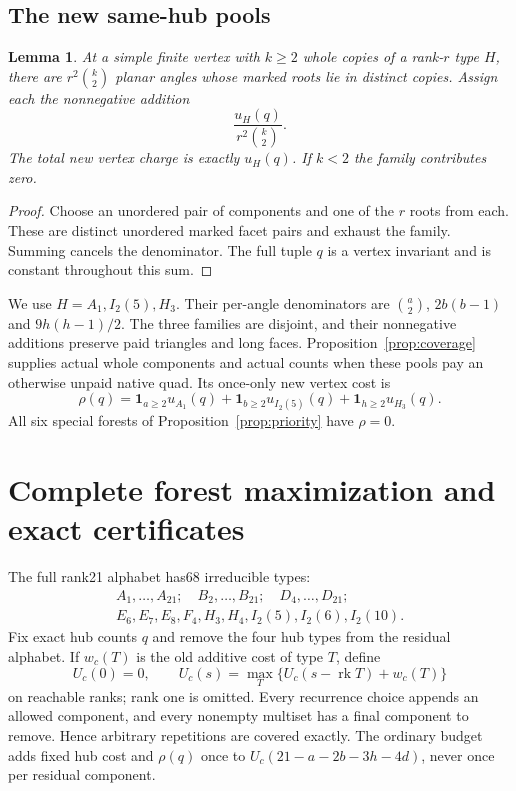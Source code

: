 \documentclass[11pt]{article}
\newtheorem{lemma}[theorem]{Lemma}
\newcommand{\rk}{\operatorname{rk}}
\begin{document}
\subsection{The new same-hub pools}
\begin{lemma}\label{lem:pools}
At a simple finite vertex with $k\ge2$ whole copies of a rank-$r$ type
$H$, there are $r^2\binom k2$ planar angles whose marked roots lie in
distinct copies. Assign each the nonnegative addition
\[
 \frac{u_H(q)}{r^2\binom k2}.
\]
The total new vertex charge is exactly $u_H(q)$. If $k<2$ the family
contributes zero.
\end{lemma}
\begin{proof}
Choose an unordered pair of components and one of the $r$ roots from
each. These are distinct unordered marked facet pairs and exhaust the
family. Summing cancels the denominator. The full tuple $q$ is a vertex
invariant and is constant throughout this sum.
\end{proof}
We use $H=A_1,I_2(5),H_3$. Their per-angle denominators are
$\binom a2$, $2b(b-1)$ and $9h(h-1)/2$. The three families are disjoint,
and their nonnegative additions preserve paid triangles and long faces.
Proposition~\ref{prop:coverage} supplies actual whole components and actual
counts when these pools pay an otherwise unpaid native quad.
Its once-only new vertex cost is
\[
 \rho(q)=\mathbf1_{a\ge2}u_{A_1}(q)
        +\mathbf1_{b\ge2}u_{I_2(5)}(q)
        +\mathbf1_{h\ge2}u_{H_3}(q).
\]
All six special forests of Proposition~\ref{prop:priority} have $\rho=0$.

\section{Complete forest maximization and exact certificates}
The full rank21 alphabet has68 irreducible types:
\[
\begin{gathered}
 A_1,\ldots,A_{21};\quad B_2,\ldots,B_{21};\quad D_4,\ldots,D_{21};\\
 E_6,E_7,E_8,F_4,H_3,H_4,I_2(5),I_2(6),I_2(10).
\end{gathered}
\]
Fix exact hub counts $q$ and remove the four hub types from the residual
alphabet. If $w_c(T)$ is the old additive cost of type $T$, define
\[
 U_c(0)=0,\qquad
 U_c(s)=\max_{T}\{U_c(s-\rk T)+w_c(T)\}
\]
on reachable ranks; rank one is omitted. Every recurrence choice appends
an allowed component, and every nonempty multiset has a final component
to remove. Hence arbitrary repetitions are covered exactly. The ordinary
budget adds fixed hub cost and $\rho(q)$ once to
$U_c(21-a-2b-3h-4d)$, never once per residual component.
\end{document}
